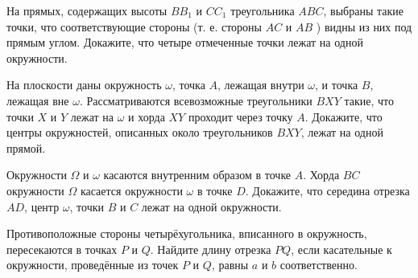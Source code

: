 На прямых, содержащих высоты $B B_1$ и $C C_1$ треугольника $A B C$, выбраны такие точки, что соответствующие стороны (т. е. стороны $A C$ и $A B$ ) видны из них под прямым углом. Докажите, что четыре отмеченные точки лежат на одной окружности.

На плоскости даны окружность $\omega$, точка $A$, лежащая внутри $\omega$, и точка $B$, лежащая вне $\omega$. Рассматриваются всевозможные треугольники $B X Y$ такие, что точки $X$ и $Y$ лежат на $\omega$ и хорда $X Y$ проходит через точку $A$. Докажите, что центры окружностей, описанных около треугольников $B X Y$, лежат на одной прямой.

Окружности $\Omega$ и $\omega$ касаются внутренним образом в точке $A$. Хорда $B C$ окружности $\Omega$ касается окружности $\omega$ в точке $D$. Докажите, что середина отрезка $A D$, центр $\omega$, точки $B$ и $C$ лежат на одной окружности.

Противоположные стороны четырёхугольника, вписанного в окружность, пересекаются в точках $P$ и $Q$. Найдите длину отрезка $P Q$, если касательные к окружности, проведённые из точек $P$ и $Q$, равны $a$ и $b$ соответственно.